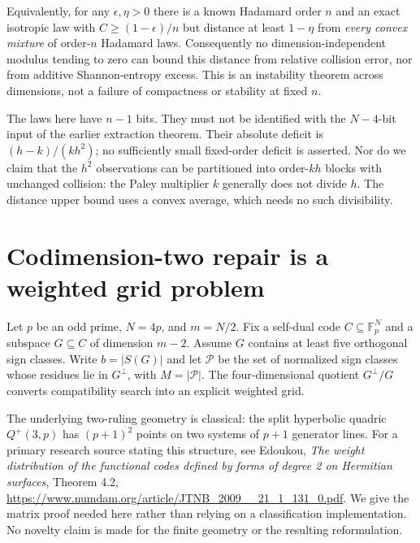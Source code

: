 \documentclass[11pt]{article}
\begin{document}
Equivalently, for any $\epsilon,\eta>0$ there is a known Hadamard
order $n$ and an exact isotropic law with
$C\ge(1-\epsilon)/n$ but distance at least $1-\eta$ from
\emph{every convex mixture} of order-$n$ Hadamard laws.
Consequently no dimension-independent modulus tending to zero can
bound this distance from relative collision error, nor from additive
Shannon-entropy excess. This is an instability theorem across
dimensions, not a failure of compactness or stability at fixed $n$.

The laws here have $n-1$ bits. They must not be identified with the
$N-4$-bit input of the earlier extraction theorem. Their absolute
deficit is $(h-k)/(kh^2)$; no sufficiently small fixed-order deficit
is asserted. Nor do we claim that the $h^2$ observations can be
partitioned into order-$kh$ blocks with unchanged collision:
the Paley multiplier $k$ generally does not divide $h$. The distance
upper bound uses a convex average, which needs no such divisibility.
\section{Codimension-two repair is a weighted grid problem}
\label{sec:quotient-grid}

Let $p$ be an odd prime, $N=4p$, and $m=N/2$. Fix a self-dual code
$C\subseteq\mathbb F_p^N$ and a subspace $G\subseteq C$ of dimension
$m-2$. Assume $G$ contains at least five orthogonal sign classes.
Write $b=|S(G)|$ and let $\mathcal P$ be the set of normalized sign
classes whose residues lie in $G^\perp$, with $M=|\mathcal P|$.
The four-dimensional quotient $G^\perp/G$ converts compatibility
search into an explicit weighted grid.

The underlying two-ruling geometry is classical: the split hyperbolic
quadric $Q^+(3,p)$ has $(p+1)^2$ points on two systems of $p+1$
generator lines. For a primary research source stating this structure,
see Edoukou, \emph{The weight distribution of the functional codes
defined by forms of degree 2 on Hermitian surfaces}, Theorem 4.2,
\url{https://www.numdam.org/article/JTNB_2009__21_1_131_0.pdf}.
We give the matrix proof needed here rather than relying on a
classification implementation. No novelty claim is made for the
finite geometry or the resulting reformulation.
\end{document}
